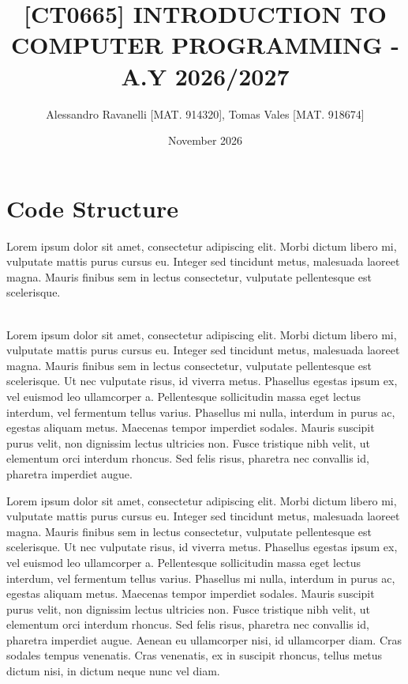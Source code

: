 \documentclass[11pt]{article}
\title{\textbf{[CT0665] INTRODUCTION TO COMPUTER PROGRAMMING - A.Y 2026/2027}}
\author{Alessandro Ravanelli [MAT. 914320], Tomas Vales [MAT. 918674]}
\date{November 2026}
\theoremstyle{definition}
\theoremstyle{remark}
\begin{document}
\maketitle

\section{Code Structure}
Lorem ipsum dolor sit amet, consectetur adipiscing elit. Morbi dictum libero mi, vulputate mattis purus cursus eu. Integer sed tincidunt metus, malesuada laoreet magna. Mauris finibus sem in lectus consectetur, vulputate pellentesque est scelerisque.
\\
\\
\begin{minipage}[t]{0.45\textwidth}
\end{minipage}
\begin{minipage}[t]{0.55\textwidth}
Lorem ipsum dolor sit amet, consectetur adipiscing elit. Morbi dictum libero mi, vulputate mattis purus cursus eu. Integer sed tincidunt metus, malesuada laoreet magna. Mauris finibus sem in lectus consectetur, vulputate pellentesque est scelerisque. Ut nec vulputate risus, id viverra metus. Phasellus egestas ipsum ex, vel euismod leo ullamcorper a. Pellentesque sollicitudin massa eget lectus interdum, vel fermentum tellus varius. Phasellus mi nulla, interdum in purus ac, egestas aliquam metus. Maecenas tempor imperdiet sodales. Mauris suscipit purus velit, non dignissim lectus ultricies non. Fusce tristique nibh velit, ut elementum orci interdum rhoncus. Sed felis risus, pharetra nec convallis id, pharetra imperdiet augue. 
\vspace{0.5cm}
\end{minipage}
Lorem ipsum dolor sit amet, consectetur adipiscing elit. Morbi dictum libero mi, vulputate mattis purus cursus eu. Integer sed tincidunt metus, malesuada laoreet magna. Mauris finibus sem in lectus consectetur, vulputate pellentesque est scelerisque. Ut nec vulputate risus, id viverra metus. Phasellus egestas ipsum ex, vel euismod leo ullamcorper a. Pellentesque sollicitudin massa eget lectus interdum, vel fermentum tellus varius. Phasellus mi nulla, interdum in purus ac, egestas aliquam metus. Maecenas tempor imperdiet sodales. Mauris suscipit purus velit, non dignissim lectus ultricies non. Fusce tristique nibh velit, ut elementum orci interdum rhoncus. Sed felis risus, pharetra nec convallis id, pharetra imperdiet augue. Aenean eu ullamcorper nisi, id ullamcorper diam. Cras sodales tempus venenatis. Cras venenatis, ex in suscipit rhoncus, tellus metus dictum nisi, in dictum neque nunc vel diam. 
\end{document}
